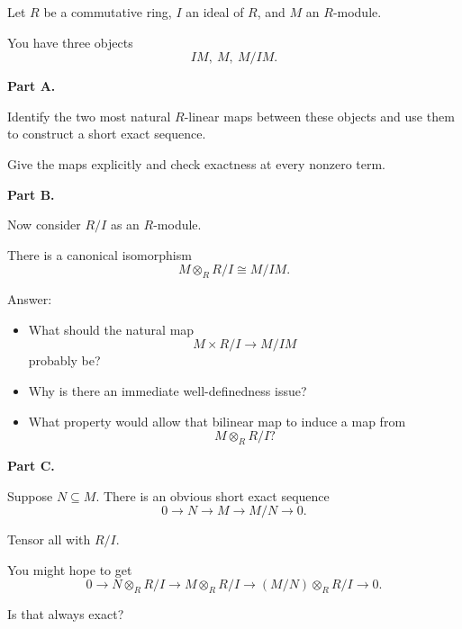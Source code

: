 \documentclass[11pt]{article}
\begin{document}
\begin{prob}
    Let $R$ be a commutative ring, $I$ an ideal of 
    $R$, and $M$ an $R$-module. 

    You have three objects 
    \[
        IM, \ M, \ M/IM. 
    \]

    \textbf{Part A.}

    Identify the two most natural $R$-linear maps 
    between these objects and use them to construct 
    a short exact sequence. 

    Give the maps explicitly and check exactness 
    at every nonzero term. 

    \textbf{Part B.}

    Now consider $R/I$ as an $R$-module. 

    There is a canonical isomorphism 
    \[
        M \otimes_R R/I \cong M/IM. 
    \]

    Answer: 
    \begin{itemize}
        \item What should the natural map 
            \[
                M \times R/I \to M/IM 
            \]
            probably be? 
        \item Why is there an immediate well-definedness issue? 
        \item What property would allow that bilinear map 
            to induce a map from 
            \[
                M \otimes_R R/I? 
            \]
    \end{itemize}

    \textbf{Part C.}

    Suppose $N \subseteq M$. 
    There is an obvious short exact sequence 
    \[
        0 \to N \to M \to M/N \to 0. 
    \]

    Tensor all with $R/I$. 

    You might hope to get 
    \[
        0 \to N \otimes_R R/I \to M \otimes_R R/I 
        \to (M/N) \otimes_R R/I \to 0. 
    \]

    Is that always exact? 
\end{prob}
\end{document}
